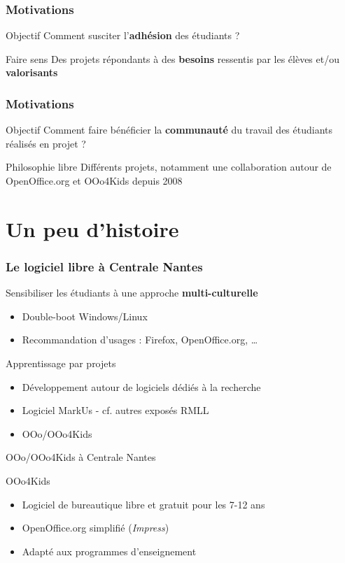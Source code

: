 \documentclass[hyperref,french,usenames,xcolor=dvipsnames]{beamer}
\begin{document}
\frame
{
  \frametitle{Motivations}

\begin{alertblock}{Objectif}
Comment susciter l'\textbf{adhésion} des étudiants ? 
\end{alertblock}

\begin{block}{Faire sens}
Des projets répondants à des \textbf{besoins} ressentis par les élèves et/ou \textbf{valorisants}
\end{block}
}

\frame
{
  \frametitle{Motivations}

\begin{alertblock}{Objectif}
Comment faire bénéficier la \textbf{communauté} du travail des étudiants réalisés en projet ?
\end{alertblock}

\begin{block}{Philosophie libre}
Différents projets, notamment une collaboration autour de OpenOffice.org et OOo4Kids depuis 2008
\end{block}
}

\section{Un peu d'histoire}

\frame
{
  \frametitle{Le logiciel libre à Centrale Nantes}

\begin{block}{Sensibiliser les étudiants à une approche \textbf{multi-culturelle}}
\begin{itemize}
\item Double-boot Windows/Linux 
\item Recommandation d'usages : Firefox, OpenOffice.org, …
\end{itemize}
\end{block}

\begin{block}{Apprentissage par projets}
\begin{itemize}
\item Développement autour de logiciels dédiés à la recherche 
\item Logiciel MarkUs - cf. autres exposés RMLL 
\item OOo/OOo4Kids
\end{itemize}
\end{block}

}


\begin{frame}{OOo/OOo4Kids à Centrale Nantes}
    \begin{block}{OOo4Kids}
	\begin{itemize}
	    \item Logiciel de bureautique libre et gratuit pour les 7-12 ans
	    \item OpenOffice.org simplifié (\textit{Impress})
	    \item Adapté aux programmes d'enseignement
	\end{itemize}
    \end{block}
\end{frame}
\end{document}
